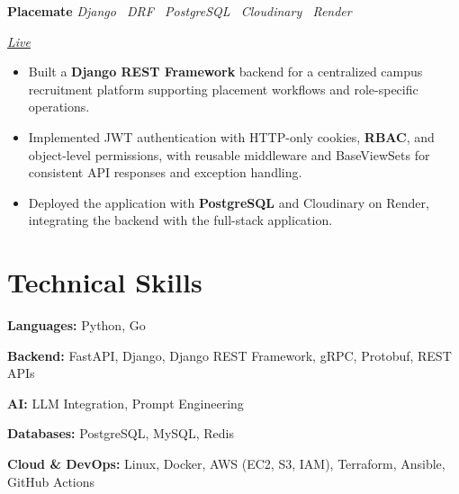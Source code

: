 \documentclass[10pt,a4paper]{article}
\newcommand{\projectentry}[3]{%
    \noindent
    \begin{minipage}[t]{0.62\linewidth}
        \raggedright
        \textbf{#1}
        \hspace{0.7em}
        \textit{\color{textgray}#2}
    \end{minipage}%
    \hfill
    \begin{minipage}[t]{0.34\linewidth}
        \raggedleft
        \itshape\color{textgray}#3
    \end{minipage}%
    \par
}
\begin{document}
\vspace{3pt}

\projectentry
    {Placemate}
    {Django \textperiodcentered\ DRF \textperiodcentered\ PostgreSQL \textperiodcentered\ Cloudinary \textperiodcentered\ Render}
    {\href{https://placemate-coral.vercel.app/}{Live}}

\vspace{2pt}

\begin{itemize}
    \item Built a \textbf{Django REST Framework} backend for a centralized campus recruitment platform supporting placement workflows and role-specific operations.

    \item Implemented JWT authentication with HTTP-only cookies, \textbf{RBAC}, and object-level permissions, with reusable middleware and BaseViewSets for consistent API responses and exception handling.

    \item Deployed the application with \textbf{PostgreSQL} and Cloudinary on Render, integrating the backend with the full-stack application.
\end{itemize}

\section*{Technical Skills}

{\fontsize{10}{12}\selectfont

\textbf{Languages:} Python, Go
\par
\textbf{Backend:} FastAPI, Django, Django REST Framework, gRPC, Protobuf, REST APIs
\par
\textbf{AI:} LLM Integration, Prompt Engineering
\par
\textbf{Databases:} PostgreSQL, MySQL, Redis
\par
\textbf{Cloud \& DevOps:} Linux, Docker, AWS (EC2, S3, IAM), Terraform, Ansible, GitHub Actions
\par

}
\end{document}
